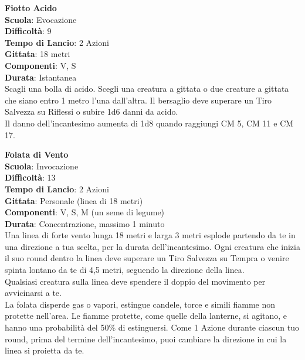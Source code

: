 \begin{multicols}{2}
\medskip\textbf{Fiotto Acido}\\
\textbf{Scuola}: Evocazione\\
\textbf{Difficoltà}:  9\\
\textbf{Tempo di Lancio}: 2 Azioni\\
\textbf{Gittata}: 18 metri\\
\textbf{Componenti}: V, S\\
\textbf{Durata}: Istantanea\\
Scagli una bolla di acido. Scegli una creatura a gittata o due creature a gittata che siano entro 1 metro l’una dall'altra. Il bersaglio deve superare un Tiro Salvezza su Riflessi o subire 1d6 danni da acido.\\
Il danno dell'incantesimo aumenta di 1d8 quando raggiungi CM 5, CM 11 e CM 17.

\medskip\textbf{Folata di Vento}\\
\textbf{Scuola}: Invocazione\\
\textbf{Difficoltà}:  13\\
\textbf{Tempo di Lancio}: 2 Azioni\\
\textbf{Gittata}: Personale (linea di 18 metri)\\
\textbf{Componenti}: V, S, M (un seme di legume)\\
\textbf{Durata}: Concentrazione, massimo 1 minuto\\
Una linea di forte vento lunga 18 metri e larga 3 metri esplode partendo da te in una direzione a tua scelta, per la durata dell'incantesimo. Ogni creatura che inizia il suo round dentro la linea deve superare un Tiro Salvezza su Tempra o venire spinta lontano da te di 4,5 metri, seguendo la direzione della linea.\\
Qualsiasi creatura sulla linea deve spendere il doppio del movimento per avvicinarsi a te.\\
La folata disperde gas o vapori, estingue candele, torce e simili fiamme non protette nell'area. Le fiamme protette, come quelle della lanterne, si agitano, e hanno una probabilità del 50\% di estinguersi. Come 1 Azione durante ciascun tuo round, prima del termine dell'incantesimo, puoi cambiare la direzione in cui la linea si proietta da te.


\end{multicols}
